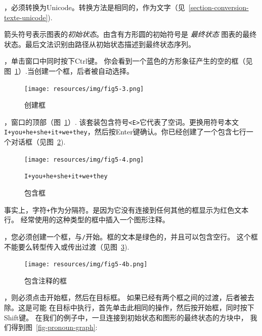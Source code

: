 \bigskip
{}，必须转换为Unicode。转换方法是相同的，作为文字（见~\ref{section-conversion-texte-unicode}).

\bigskip
\noindent 箭头符号表示图表的\textit{初始状态}。由含有方形圆的初始符号是  \textit{最终状态} 图表的最终状态。最后文法识别由路径从初始状态描述到最终状态序列。

\bigskip
{}，单击窗口中同时按下Ctrl键。
 
你会看到一个蓝色的方形象征产生的空的框（见图~\ref{fig-box-creation}）.当创建一个框，后者被自动选择。

\begin{figure}[!h]
\begin{center}
\texttt{[image: resources/img/fig5-3.png]}
\caption{创建框\label{fig-box-creation}}
\end{center}
\end{figure}

\bigskip
{}，窗口的顶部（图~\ref{fig-box-creation}）.
该套装包含符号\verb+<E>+它代表了空词。更换用符号本文\verb$I+you+he+she+it+we+they$，然后按Enter键确认。你已经创建了一个包含七行一个对话框（见图~\ref{fig-pronoun-box}).

\begin{figure}[!h]
\begin{center}
\texttt{[image: resources/img/fig5-4.png]}
\caption{包含框}
\texttt{I+you+he+she+it+we+they}\label{fig-pronoun-box}
\end{center}
\end{figure}

\bigskip
\noindent 事实上，字符\verb$+$作为分隔符。\index{\verb$+$}是因为它没有连接到任何其他的框显示为红色文本行。
经常使用的这种类型的框中插入一个图形注释。

\bigskip
{}，您必须创建一个框，与\verb$/$开始。框的文本是绿色的，并且可以包含空行。
这个框不能要么转型传入或传出过渡（见图~\ref{comment-box}).

\begin{figure}[!h]
\begin{center}
\texttt{[image: resources/img/fig5-4b.png]}
\caption{包含注释的框\label{comment-box}}
\end{center}
\end{figure}

\bigskip
{}，则必须点击开始框，然后在目标框。
如果已经有两个框之间的过渡，后者被去除。这是可能
在目标中执行，首先单击此相同的操作，然后按开始框，同时按下Shift键。
在我们的例子中，一旦连接到初始状态和图形的最终状态的方块中，
我们得到图~\ref{fig-pronoun-graph}:

